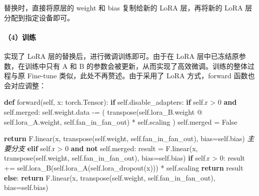 \documentclass[
]{article}
\newenvironment{Shaded}{}{}
\newcommand{\CommentTok}[1]{\textcolor[rgb]{0.38,0.63,0.69}{\textit{#1}}}
\newcommand{\ControlFlowTok}[1]{\textcolor[rgb]{0.00,0.44,0.13}{\textbf{#1}}}
\newcommand{\DecValTok}[1]{\textcolor[rgb]{0.25,0.63,0.44}{#1}}
\newcommand{\KeywordTok}[1]{\textcolor[rgb]{0.00,0.44,0.13}{\textbf{#1}}}
\newcommand{\NormalTok}[1]{#1}
\newcommand{\OperatorTok}[1]{\textcolor[rgb]{0.40,0.40,0.40}{#1}}
\newcommand{\VariableTok}[1]{\textcolor[rgb]{0.10,0.09,0.49}{#1}}
\begin{document}
替换时，直接将原层的 weight 和 bias 复制给新的 LoRA 层，再将新的 LoRA
层分配到指定设备即可。

\paragraph{（4）训练}\label{ux8badux7ec3}

实现了 LoRA 层的替换后，进行微调训练即可。由于在 LoRA
层中已冻结原参数，在训练中只有 A 和 B
的参数会被更新，从而实现了高效微调。训练的整体过程与原 Fine-tune
类似，此处不再赘述。由于采用了 LoRA 方式，forward 函数也会对应调整：

\begin{Shaded}
\begin{Highlighting}[]
    \KeywordTok{def}\NormalTok{ forward(}\VariableTok{self}\NormalTok{, x: torch.Tensor):}
        \ControlFlowTok{if} \VariableTok{self}\NormalTok{.disable\_adapters:}
            \ControlFlowTok{if} \VariableTok{self}\NormalTok{.r }\OperatorTok{\textgreater{}} \DecValTok{0} \KeywordTok{and} \VariableTok{self}\NormalTok{.merged:}
                \VariableTok{self}\NormalTok{.weight.data }\OperatorTok{{-}=}\NormalTok{ (}
\NormalTok{                    transpose(}\VariableTok{self}\NormalTok{.lora\_B.weight }\OperatorTok{@} \VariableTok{self}\NormalTok{.lora\_A.weight, }\VariableTok{self}\NormalTok{.fan\_in\_fan\_out) }\OperatorTok{*} \VariableTok{self}\NormalTok{.scaling}
\NormalTok{                )}
                \VariableTok{self}\NormalTok{.merged }\OperatorTok{=} \VariableTok{False}

            \ControlFlowTok{return}\NormalTok{ F.linear(x, transpose(}\VariableTok{self}\NormalTok{.weight, }\VariableTok{self}\NormalTok{.fan\_in\_fan\_out), bias}\OperatorTok{=}\VariableTok{self}\NormalTok{.bias)}
        \CommentTok{\textquotesingle{}\textquotesingle{}\textquotesingle{}主要分支\textquotesingle{}\textquotesingle{}\textquotesingle{}}
        \ControlFlowTok{elif} \VariableTok{self}\NormalTok{.r }\OperatorTok{\textgreater{}} \DecValTok{0} \KeywordTok{and} \KeywordTok{not} \VariableTok{self}\NormalTok{.merged:}
\NormalTok{            result }\OperatorTok{=}\NormalTok{ F.linear(x, transpose(}\VariableTok{self}\NormalTok{.weight, }\VariableTok{self}\NormalTok{.fan\_in\_fan\_out), bias}\OperatorTok{=}\VariableTok{self}\NormalTok{.bias)}
            \ControlFlowTok{if} \VariableTok{self}\NormalTok{.r }\OperatorTok{\textgreater{}} \DecValTok{0}\NormalTok{:}
\NormalTok{                result }\OperatorTok{+=} \VariableTok{self}\NormalTok{.lora\_B(}\VariableTok{self}\NormalTok{.lora\_A(}\VariableTok{self}\NormalTok{.lora\_dropout(x))) }\OperatorTok{*} \VariableTok{self}\NormalTok{.scaling}
            \ControlFlowTok{return}\NormalTok{ result}
        \ControlFlowTok{else}\NormalTok{:}
            \ControlFlowTok{return}\NormalTok{ F.linear(x, transpose(}\VariableTok{self}\NormalTok{.weight, }\VariableTok{self}\NormalTok{.fan\_in\_fan\_out), bias}\OperatorTok{=}\VariableTok{self}\NormalTok{.bias)}
\end{Highlighting}
\end{Shaded}
\end{document}
